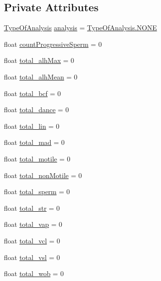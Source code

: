 \subsection*{Private Attributes}
\begin{DoxyCompactItemize}
\item 
\hyperlink{enumanalysis_1_1_motility_1_1_type_of_analysis}{Type\+Of\+Analysis} \hyperlink{classanalysis_1_1_motility_ae0c6f15cfb3c589fb7817738e51998bd}{analysis} = \hyperlink{enumanalysis_1_1_motility_1_1_type_of_analysis_a899caa602e4fff675b17cdbab33607ec}{Type\+Of\+Analysis.\+N\+O\+NE}
\item 
float \hyperlink{classanalysis_1_1_motility_a4781116c1a5f8316e2cacb2e92dac270}{count\+Progressive\+Sperm} = 0
\item 
float \hyperlink{classanalysis_1_1_motility_a35f4543589a6af76e2ba8e813e9c8d15}{total\+\_\+alh\+Max} = 0
\item 
float \hyperlink{classanalysis_1_1_motility_a85064380da24660107d26a563b17e002}{total\+\_\+alh\+Mean} = 0
\item 
float \hyperlink{classanalysis_1_1_motility_aa42afc6b771762a4c51d2ac098050a2c}{total\+\_\+bcf} = 0
\item 
float \hyperlink{classanalysis_1_1_motility_aac49177d1bc39508a93db152eb8f8c61}{total\+\_\+dance} = 0
\item 
float \hyperlink{classanalysis_1_1_motility_a051b97e22d0b6acb0d861dd7e4e26f94}{total\+\_\+lin} = 0
\item 
float \hyperlink{classanalysis_1_1_motility_a5c428e4bdee1a7aa6c30ce2789a781db}{total\+\_\+mad} = 0
\item 
float \hyperlink{classanalysis_1_1_motility_aec24fedb6d4751dbc92852b6b7c467f4}{total\+\_\+motile} = 0
\item 
float \hyperlink{classanalysis_1_1_motility_a12c018b723047f29c67110a7bb1134a8}{total\+\_\+non\+Motile} = 0
\item 
float \hyperlink{classanalysis_1_1_motility_a2815eaed86c0b1e82e0fa050070546de}{total\+\_\+sperm} = 0
\item 
float \hyperlink{classanalysis_1_1_motility_ae849455f41cc53bf86d72ca509155a83}{total\+\_\+str} = 0
\item 
float \hyperlink{classanalysis_1_1_motility_ae4d5fa9ba9511057ab1b12594029ebd5}{total\+\_\+vap} = 0
\item 
float \hyperlink{classanalysis_1_1_motility_a39e3cc2644471738bffd77164ecefa1a}{total\+\_\+vcl} = 0
\item 
float \hyperlink{classanalysis_1_1_motility_a9fca6ddbc4e27eaf9181320d32dbd631}{total\+\_\+vsl} = 0
\item 
float \hyperlink{classanalysis_1_1_motility_a8884d2acf5fc9ed45c9b8d775da894ce}{total\+\_\+wob} = 0
\end{DoxyCompactItemize}


